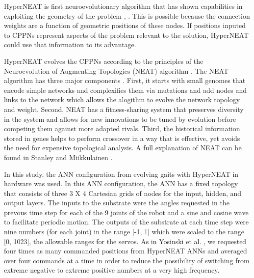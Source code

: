 HyperNEAT is first neuroevolutionary algorithm that has shown capabilities in exploiting the geometry of the problem \cite{stanley1}, \cite{clune3}.
This is possible because the connection weights are a function of geometric positions of these nodes. 
If positions inputed to CPPNs represent aspects of the problem relevant to the solution, HyperNEAT could use that information to its advantage.  


HyperNEAT evolves the CPPNs according to the principles of the Neuroevolution of Augmenting Topologies (NEAT) algorithm \cite{stanley4}. 
The NEAT algorithm has three major components \cite{stanley4}. 
First, it starts with small genomes that encode simple networks and complexifies them via mutations and add nodes and links to the network which allows the alogithm to evolve the network topology and weight. 
Second, NEAT has a fitness-sharing system that preserves diversity in the system and allows for new innovations to be tuned by evolution before competing them against more adapted rivals. 
Third, the historical information stored in genes helps to perform crossover in a way that is effective, yet avoids the need for expensive topological analysis. A full explanation of NEAT can be found in Stanley and Miikkulainen \cite{stanley4}. 


In this study, the ANN configuration from evolving gaits with HyperNEAT in hardware \cite{yos:clune} was used. 
In this ANN configuration, the ANN has a fixed topology that consists of three 3 X 4 Cartesian grids of nodes for the input, hidden, and output layers. 
The inputs to the substrate were the angles requested in the prevous time step for each of the 9 joints of the robot and a sine and cosine wave to facilitate periodic motion. 
The outputs of the substrate at each time step were nine numbers (for each joint) in the range [-1, 1] which were scaled to the range [0, 1023], the allowable ranges for the servos. 
As in Yosinski et al. \cite{yos:clune}, we requested four times as many commanded positions from HyperNEAT ANNs and averaged over four commands at a time in order to reduce the possibility of switching from extreme negative to extreme positive numbers at a very high frequency. 


